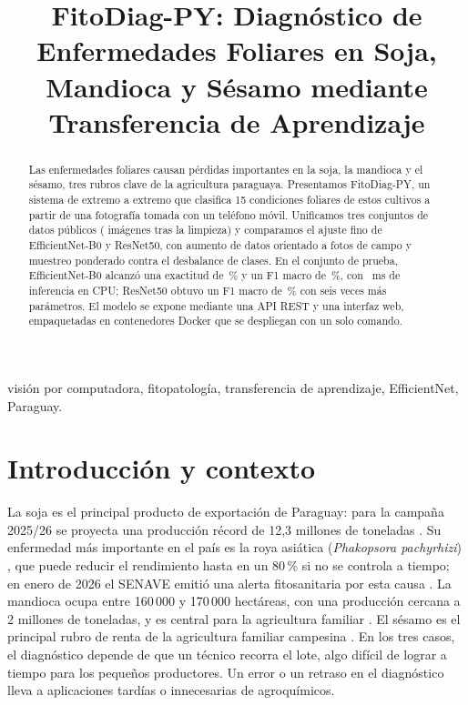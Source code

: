 \documentclass[conference]{IEEEtran}
\newcommand{\pend}[1]{\textcolor{red}{#1}}
\begin{document}
\title{FitoDiag-PY: Diagn\'ostico de Enfermedades Foliares en Soja, Mandioca y S\'esamo mediante Transferencia de Aprendizaje}

\author{
\IEEEauthorblockA{\pend{Carrera, Facultad, Universidad}\\
\pend{Ciudad, Paraguay}\\
\pend{correo1@ejemplo.com, correo2@ejemplo.com}}}

\maketitle

\begin{abstract}
Las enfermedades foliares causan p\'erdidas importantes en la soja, la mandioca y el s\'esamo, tres rubros clave de la agricultura paraguaya. Presentamos FitoDiag-PY, un sistema de extremo a extremo que clasifica 15 condiciones foliares de estos cultivos a partir de una fotograf\'ia tomada con un tel\'efono m\'ovil. Unificamos tres conjuntos de datos p\'ublicos (\dsKept{} im\'agenes tras la limpieza) y comparamos el ajuste fino de EfficientNet-B0 y ResNet50, con aumento de datos orientado a fotos de campo y muestreo ponderado contra el desbalance de clases. En el conjunto de prueba, EfficientNet-B0 alcanz\'o una exactitud de \effAcc\,\% y un F1 macro de \effFone\,\%, con \effMs~ms de inferencia en CPU; ResNet50 obtuvo un F1 macro de \resFone\,\% con seis veces m\'as par\'ametros. El modelo se expone mediante una API REST y una interfaz web, empaquetadas en contenedores Docker que se despliegan con un solo comando.
\end{abstract}

\begin{IEEEkeywords}
visi\'on por computadora, fitopatolog\'ia, transferencia de aprendizaje, EfficientNet, Paraguay.
\end{IEEEkeywords}

\section{Introducci\'on y contexto}

La soja es el principal producto de exportaci\'on de Paraguay: para la campa\~na 2025/26 se proyecta una producci\'on r\'ecord de 12,3 millones de toneladas \cite{lanacion2026soja}. Su enfermedad m\'as importante en el pa\'is es la roya asi\'atica (\textit{Phakopsora pachyrhizi}) \cite{enciso2021roya}, que puede reducir el rendimiento hasta en un 80\,\% si no se controla a tiempo; en enero de 2026 el SENAVE emiti\'o una alerta fitosanitaria por esta causa \cite{lanacion2026roya}. La mandioca ocupa entre 160\,000 y 170\,000 hect\'areas, con una producci\'on cercana a 2 millones de toneladas, y es central para la agricultura familiar \cite{ultimahora2026mandioca}. El s\'esamo es el principal rubro de renta de la agricultura familiar campesina \cite{lanacion2024sesamo}. En los tres casos, el diagn\'ostico depende de que un t\'ecnico recorra el lote, algo dif\'icil de lograr a tiempo para los peque\~nos productores. Un error o un retraso en el diagn\'ostico lleva a aplicaciones tard\'ias o innecesarias de agroqu\'imicos.
\end{document}
